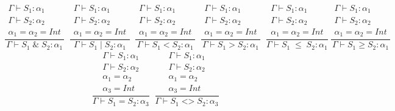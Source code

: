 \documentclass[10pt]{article} %
\begin{document}
\begin{enumerate}
$$\frac{\begin{matrix}\Gamma \vdash S_1: \alpha_1\\ \Gamma \vdash S_2: \alpha_2 \\ \alpha_1 = \alpha_2 = Int\end{matrix}}{\Gamma \vdash S_1\; \texttt{\&} \;S_2 : \alpha_1}\;\;
\frac{\begin{matrix}\Gamma \vdash S_1: \alpha_1\\ \Gamma \vdash S_2: \alpha_2 \\ \alpha_1 = \alpha_2 = Int\end{matrix}}{\Gamma \vdash S_1\; \texttt{|}\; S_2 : \alpha_1}\;\;
\frac{\begin{matrix}\Gamma \vdash S_1: \alpha_1\\ \Gamma \vdash S_2: \alpha_2 \\ \alpha_1 = \alpha_2 = Int\end{matrix}}{\Gamma \vdash S_1\; \texttt{<}\; S_2 : \alpha_1}\;\;
\frac{\begin{matrix}\Gamma \vdash S_1: \alpha_1\\ \Gamma \vdash S_2: \alpha_2 \\ \alpha_1 = \alpha_2 = Int\end{matrix}}{\Gamma \vdash S_1 \;\texttt{>}\; S_2 : \alpha_1}\;\; 
\frac{\begin{matrix}\Gamma \vdash S_1: \alpha_1\\ \Gamma \vdash S_2: \alpha_2 \\ \alpha_1 = \alpha_2 = Int\end{matrix}}{\Gamma \vdash S_1\; \le\; S_2 : \alpha_1}\ 
\frac{\begin{matrix}\Gamma \vdash S_1: \alpha_1\\ \Gamma \vdash S_2: \alpha_2 \\ \alpha_1 = \alpha_2 = Int\end{matrix}}{\Gamma \vdash S_1 \ge S_2 : \alpha_1}\;\;$$
$$\frac{\begin{matrix}\Gamma \vdash S_1: \alpha_1\\ \Gamma \vdash S_2: \alpha_2 \\ \alpha_1 = \alpha_2\\ \alpha_3 = Int\end{matrix}}{\Gamma \vdash S_1 \;\texttt{=}\; S_2 : \alpha_3}\;\;
\frac{\begin{matrix}\Gamma \vdash S_1: \alpha_1\\ \Gamma \vdash S_2: \alpha_2 \\ \alpha_1 = \alpha_2\\ \alpha_3 = Int\end{matrix}}{\Gamma \vdash S_1 \;\texttt{<>}\; S_2 : \alpha_3}\;\;
$$
\end{enumerate}
\end{document}
